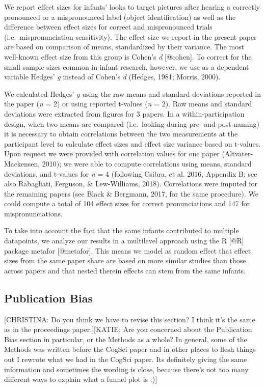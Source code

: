 \documentclass[man]{apa6}
\theoremstyle{definition}
\theoremstyle{definition}
\theoremstyle{definition}
\theoremstyle{remark}
\begin{document}
We report effect sizes for infants' looks to target pictures after
hearing a correctly pronounced or a mispronounced label (object
identification) as well as the difference between effect sizes for
correct and mispronounced trials (i.e.~mispronunciation sensitivity).
The effect size we report in the present paper are based on comparison
of means, standardized by their variance. The most well-known effect
size from this group is Cohen's \emph{d} {[}@cohen{]}. To correct for
the small sample sizes common in infant research, however, we use as a
dependent variable Hedges' \emph{g} instead of Cohen's \emph{d} (Hedges,
1981; Morris, 2000).

We calculated Hedges' \emph{g} using the raw means and standard
deviations reported in the paper (\emph{n} = 2) or using reported
t-values (\emph{n} = 2). Raw means and standard deviations were
extracted from figures for 3 papers. In a within-participation design,
when two means are compared (i.e.~looking during pre- and post-naming)
it is necessary to obtain correlations between the two measurements at
the participant level to calculate effect sizes and effect size variance
based on t-values. Upon request we were provided with correlation values
for one paper (Altvater-Mackensen, 2010); we were able to compute
correlations using means, standard deviations, and t-values for \emph{n}
= 4 (following Csibra, et al. 2016, Appendix B; see also Rabagliati,
Ferguson, \& Lew-Williams, 2018). Correlations were imputed for the
remaining papers (see Black \& Bergmann, 2017, for the same procedure).
We could compute a total of 104 effect sizes for correct pronunciations
and 147 for mispronunciations.

To take into account the fact that the same infants contributed to
multiple datapoints, we analyze our results in a multilevel approach
using the R {[}@R{]} package metafor {[}@metafor{]}. This means we model
as random effect that effect sizes from the same paper share are based
on more similar studies than those across papers and that nested therein
effects can stem from the same infants.

\subsection{Publication Bias}\label{publication-bias}

{[}CHRISTINA: Do you think we have to revise this section? I think it's
the same as in the proceedings paper.{]}{[}KATIE: Are you concerned
about the Publication Bias section in particular, or the Methods as a
whole? In general, some of the Methods was written before the CogSci
paper and in other places to flesh things out I rewrote what we had in
the CogSci paper. Its definitely giving the same information and
sometimes the wording is close, because there's not too many different
ways to explain what a funnel plot is :){]}
\end{document}
